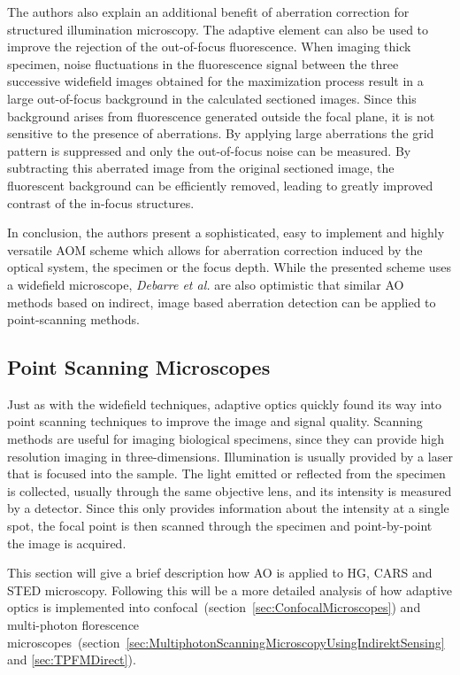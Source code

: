 The authors also explain an additional benefit of aberration correction for structured illumination microscopy. The adaptive element can also be used to improve the rejection of the out-of-focus fluorescence. When imaging thick specimen, noise fluctuations in the fluorescence signal between the three successive widefield images obtained for the maximization process result in a large out-of-focus background in the calculated sectioned images. Since this background arises from fluorescence generated outside the focal plane, it is not sensitive to the presence of aberrations. By applying large aberrations the grid pattern is suppressed and only the out-of-focus noise can be measured. By subtracting this aberrated image from the original sectioned image, the fluorescent background can be efficiently removed, leading to greatly improved contrast of the in-focus structures. 

In conclusion, the authors present a sophisticated, easy to implement and highly versatile AOM scheme which allows for aberration correction induced by the optical system, the specimen or the focus depth. While the presented scheme uses a widefield microscope, \emph{Debarre et al.} are also optimistic that similar AO methods based on indirect, image based aberration detection can be applied to point-scanning methods. 

\subsection{Point Scanning Microscopes}
\label{sec:PointScanningMicroscopes}

Just as with the widefield techniques, adaptive optics quickly found its way into point scanning techniques to improve the image and signal quality. Scanning methods are useful for imaging biological specimens, since they can provide high resolution imaging in three-dimensions. Illumination is usually provided by a laser that is focused into the sample. The light emitted or reflected from the specimen is collected, usually through the same objective lens, and its intensity is measured by a detector. Since this only provides information about the intensity at a single spot, the focal point is then scanned through the specimen and point-by-point the image is acquired. 

This section will give a brief description how AO is applied to HG, CARS and STED microscopy. Following this will be a more detailed analysis of how adaptive optics is implemented into confocal~(section~\ref{sec:ConfocalMicroscopes}) and multi-photon florescence microscopes~(section~\ref{sec:MultiphotonScanningMicroscopyUsingIndirektSensing} and \ref{sec:TPFMDirect}). 

